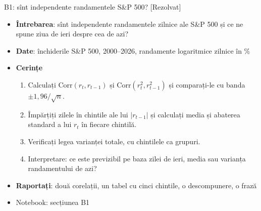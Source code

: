 \begin{frame}{B1: sînt independente randamentele S\&P 500? [Rezolvat]}
\itemsize{\footnotesize}
\begin{itemize}
\item \textbf{Întrebarea}: sînt independente randamentele zilnice ale S\&P 500 și ce ne spune ziua de ieri despre cea de azi?
\item \textbf{Date}: închiderile S\&P 500, 2000--2026, randamente logaritmice zilnice în \%
\item \textbf{Cerințe}
\begin{enumerate}
    \item Calculați $\text{Corr}(r_t, r_{t-1})$ și $\text{Corr}(r_t^2, r_{t-1}^2)$ și comparați-le cu banda $\pm 1{,}96/\sqrt{n}$.
    \item Împărțiți zilele în chintile ale lui $|r_{t-1}|$ și calculați media și abaterea standard a lui $r_t$ în fiecare chintilă.
    \item Verificați legea varianței totale, cu chintilele ca grupuri.
    \item Interpretare: ce este previzibil pe baza zilei de ieri, media sau varianța randamentului de azi?
\end{enumerate}
\item \textbf{Raportați}: două corelații, un tabel cu cinci chintile, o descompunere, o frază
\item Notebook: secțiunea B1
\end{itemize}
\end{frame}

